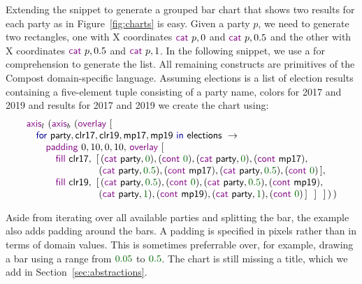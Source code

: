 \documentclass{jfp}
\newcommand{\num}[1]{\textcolor{numclr}{#1}}
\newcommand{\ident}[1]{\textnormal{\textcolor{idclr}{\sffamily #1}}}
\newcommand{\kvd}[1]{\textnormal{\textcolor{kvdclr}{\sffamily #1}}}
\newcommand{\fkvd}[1]{\textnormal{\textcolor{fkvdclr}{\sffamily #1}}}
\begin{document}
Extending the snippet to generate a grouped bar chart that shows two results
for each party as in Figure~\ref{fig:charts} is easy. Given a party $p$, we need to
generate two rectangles, one with X coordinates $\kvd{cat}~p, 0$ and $\kvd{cat}~p, 0.5$
and the other with X coordinates $\kvd{cat}~p, 0.5$ and $\kvd{cat}~p, 1$.
In the following snippet, we use a \fkvd{for} comprehension to generate the list. All remaining
constructs are primitives of the Compost domain-specific language. Assuming \ident{elections} is a
list of election results containing a five-element tuple consisting of a party name, colors for
2017 and 2019 and results for 2017 and 2019 we create the chart using:
%
\begin{equation*}
\begin{array}{l}
  \kvd{axis}_l~(\kvd{axis}_b~(\kvd{overlay}~[\\
  \quad \fkvd{for}~\ident{party}, \ident{clr17}, \ident{clr19}, \ident{mp17}, \ident{mp19}~\fkvd{in}~\ident{elections}~\rightarrow\\
  \quad\quad \kvd{padding}~0,10,0,10,\,\kvd{overlay}~[\\
  \quad\quad\quad \kvd{fill}~\ident{clr17},~[\,(\kvd{cat}~\ident{party}, \num{0}), (\kvd{cont}~\num{0}), (\kvd{cat}~\ident{party}, \num{0}), (\kvd{cont}~\ident{mp17}),\\
  \quad\quad\quad \hspace{4.08em}           ~(\kvd{cat}~\ident{party}, \num{0.5}), (\kvd{cont}~\ident{mp17}), (\kvd{cat}~\ident{party}, \num{0.5}), (\kvd{cont}~\num{0}) \,], \\
  \quad\quad\quad \kvd{fill}~\ident{clr19},~[\,(\kvd{cat}~\ident{party}, \num{0.5}), (\kvd{cont}~\num{0}), (\kvd{cat}~\ident{party}, \num{0.5}), (\kvd{cont}~\ident{mp19}),\\
  \quad\quad\quad \hspace{4.08em}           ~(\kvd{cat}~\ident{party}, \num{1}), (\kvd{cont}~\ident{mp19}), (\kvd{cat}~\ident{party}, \num{1}), (\kvd{cont}~\num{0})\,]~~]~~]\,)\,)\\
\end{array}
\end{equation*}

\noindent
Aside from iterating over all available parties and splitting the bar, the example also adds padding
around the bars. A padding is specified in pixels rather than in terms of domain values. This is
sometimes preferrable over, for example, drawing a bar using a range from $\num{0.05}$ to $\num{0.5}$.
The chart is still missing a title, which we add in Section~\ref{sec:abstractions}.
\end{document}
